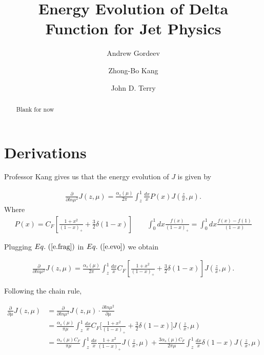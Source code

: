 \documentclass[floatfix,aps,prd,nofootinbib,superscriptaddress,preprint]{revtex4}
\newcommand\3[1]{\boldsymbol{#1}}
\newcommand{\eref}[1]{Eq.~(\ref{e.#1})}
\begin{document}
	
\title{Energy Evolution of Delta Function for Jet Physics}
	
\author{Andrew Gordeev}

\author{Zhong-Bo Kang}

\author{John D. Terry}
	
\begin{abstract}
	Blank for now
\end{abstract}
	
\maketitle
	

\section{Derivations}

Professor Kang gives us that the energy evolution of $J$ is given by

\begin{align}
	\frac{\partial}{\partial ln \mu^2} J(z, \mu) = \frac{\alpha_s(\mu)}{2\pi}\int_z^1 \frac{dx}{x}P(x)J(\frac{z}{x}, \mu).
	\label{e.evo}
\end{align}
Where 
\begin{align}
	P(x) = C_F[\frac{1+x^2}{(1-x)_+}+\frac{3}{2}\delta(1-x)]
	\label{e.frag}
	\qquad
	\int_0^1 dx \frac{f(x)}{(1-x)_+} = \int_0^1 dx \frac{f(x)-f(1)}{(1-x)}
\end{align}

Plugging $\eref{frag}$ in $\eref{evo}$ we obtain

\begin{align*}
\frac{\partial}{\partial ln \mu^2} J(z, \mu) = \frac{\alpha_s(\mu)}{2\pi}\int_z^1 \frac{dx}{x}C_F[\frac{1+x^2}{(1-x)_+}+\frac{3}{2}\delta(1-x)]J(\frac{z}{x}, \mu).
\end{align*}

Following the chain rule, 

\begin{align}
	\frac{\partial}{\partial \mu} J(z, \mu) &= \frac{\partial}{\partial ln \mu^2} J(z, \mu) \cdot \frac{\partial ln \mu^2}{\partial \mu} \nonumber \\
	&= \frac{\alpha_s(\mu)}{\pi\mu}\int_z^1 \frac{dx}{x}C_F \Big[\frac{1+x^2}{(1-x)_+}+\frac{3}{2}\delta(1-x) \Big] J(\frac{z}{x}, \mu) \nonumber \\
	&= \frac{\alpha_s(\mu) C_F}{\pi\mu}\int_z^1 \frac{dx}{x}\frac{1+x^2}{(1-x)_+}J(\frac{z}{x}, \mu) + \frac{3\alpha_s(\mu) C_F}{2 \pi\mu}\int_z^1 \frac{dx}{x} \delta(1-x)J(\frac{z}{x}, \mu)
    \label{e.split}
\end{align}
\end{document}
